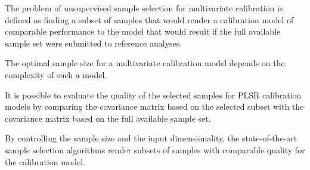 \documentclass[preprint,12pt]{elsarticle}
\begin{document}
\begin{highlights}
\item The problem of unsupervised sample selection for multivariate calibration is defined as finding a subset of samples that would render a calibration model of comparable performance to the model that would result if the full available sample set were submitted to reference analyses.
\item The optimal sample size for a multivariate calibration model depends on the complexity of such a model.
\item It is possible to evaluate the quality of the selected samples for PLSR calibration models by comparing the covariance matrix based on the selected subset with the covariance matrix based on the full available sample set.
\item By controlling the sample size and the input dimensionality, the state-of-the-art sample selection algorithms render subsets of samples with comparable quality for the calibration model.
\end{highlights}
\end{document}
